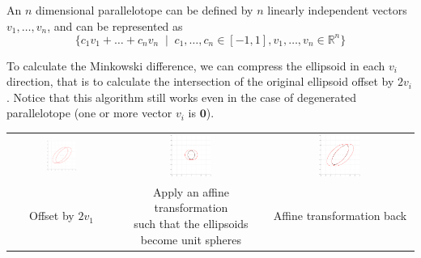 \documentclass{article}
\begin{document}
An $n$ dimensional parallelotope can be defined by $n$ linearly independent vectors $v_1, \dots, v_n$, and can be represented as 
$$
\{ c_1 v_1 + \dots + c_n v_n  \;\; | \;\; c_1,  \dots,  c_n \in [-1, 1], v_1,  \dots,  v_n \in \mathbb{R}^n\}
$$

To calculate the Minkowski difference, we can compress the ellipsoid in each $v_i$ direction, that is to calculate the intersection of the original ellipsoid offset by $2v_i$. Notice that this algorithm still works even in the case of degenerated parallelotope (one or more vector $v_i$ is $\mathbf{0}$).

\begin{table}[h!]
	\centering
	\begin{tabular}{ccc}
		\includegraphics[width=0.3\textwidth]{intersect_offset_ia/3.pdf} & \includegraphics[width=0.3\textwidth]{intersect_offset_ia/4.pdf} & \includegraphics[width=0.3\textwidth]{intersect_offset_ia/5.pdf}\\
		Offset by $2v_1$ & \makecell{Apply an affine transformation \\such that the ellipsoids \\become unit spheres} & Affine transformation back \\

\end{tabular}
\end{table}
\end{document}
